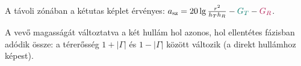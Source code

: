 A távoli zónában a kétutas képlet érvényes: $a_\mathrm{sz}=20\lg\frac{r^2}{h_Th_R}-{\cd{G_T}}-{\ce{G_R}}$.

\begin{center}\end{center}

A vevő magasságát változtatva a két hullám hol azonos, hol ellentétes fázisban adódik össze: a térerősség $1+|\Gamma|$ és $1-|\Gamma|$ között változik (a direkt hullámhoz képest).

\begin{center}\end{center}
\begin{eredmeny}

\begin{center}\end{center}
\end{eredmeny}


